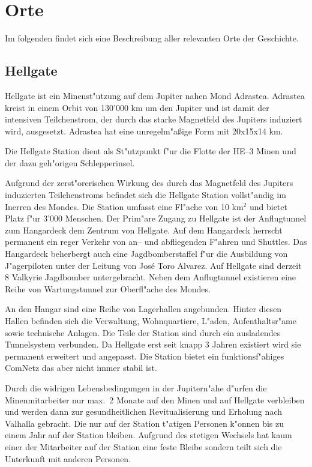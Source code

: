 \section{Orte}

Im folgenden findet sich eine Beschreibung aller relevanten Orte der Geschichte.

\subsection{Hellgate}

Hellgate ist ein Minenst"utzung auf dem Jupiter nahen Mond Adrastea. Adrastea kreist in einem Orbit von 130'000 km um den Jupiter und
ist damit der intensiven Teilchenstrom, der durch das starke Magnetfeld des Jupiters induziert wird, ausgesetzt. Adrastea hat eine unregelm"aßige Form mit 20x15x14 km.

Die Hellgate Station dient als St"utzpunkt f"ur die Flotte der HE--3 Minen und der dazu geh"origen Schlepperinsel. 

Aufgrund der zerst"orerischen Wirkung des durch das Magnetfeld des Jupiters induzierten Teilchenstroms befindet sich die Hellgate Station vollst"andig im Inerren des Mondes. Die Station umfasst eine Fl"ache von 10 km$^{2}$ und bietet Platz f"ur 3'000 Menschen. Der Prim"are Zugang zu Hellgate ist der Anflugtunnel zum Hangardeck dem Zentrum von Hellgate. Auf dem Hangardeck herrscht permanent ein reger Verkehr von an-- und abfliegenden F"ahren und Shuttles. Das Hangardeck beherbergt auch eine Jagdbomberstaffel f"ur die Ausbildung von J"agerpiloten unter der Leitung von Jos\'{e} \frqq{}Toro\flqq{} Alvarez. Auf Hellgate sind derzeit 8 Valkyrie Jagdbomber untergebracht. Neben dem Anflugtunnel existieren eine Reihe von Wartungstunnel zur Oberfl"ache des Mondes.

An den Hangar sind eine Reihe von Lagerhallen angebunden. Hinter diesen Hallen befinden sich die Verwaltung, Wohnquartiere, L"aden, Aufenthaltsr"ame sowie technische Anlagen. Die Teile der Station sind durch ein ausladendes Tunnelsystem verbunden. Da Hellgate erst seit knapp 3 Jahren existiert wird sie permanent erweitert und angepasst. Die Station bietet ein funktionsf"ahiges ComNetz das aber nicht immer stabil ist.

Durch die widrigen Lebensbedingungen in der Jupitern"ahe d"urfen die Minenmitarbeiter nur max.~2 Monate auf den Minen und auf Hellgate verbleiben und werden dann zur gesundheitlichen Revitualisierung und Erholung nach Valhalla gebracht. Die nur auf der Station t"atigen Personen k"onnen bis zu einem Jahr auf der Station bleiben. Aufgrund des stetigen Wechsels hat kaum einer der Mitarbeiter auf der Station eine feste Bleibe sondern teilt sich die Unterkunft mit anderen Personen.

